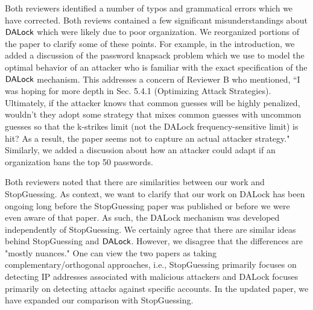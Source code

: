 

 Both reviewers identified a number of typos and grammatical errors which we have corrected. Both reviews contained a few significant misunderstandings about $\mathsf{DALock}$ which were likely due to poor organization. We reorganized portions of the paper to clarify some of these points. For example, in the introduction, we added a discussion of the password knapsack problem which we use to model the optimal behavior of an attacker who is familiar with the exact specification of the $\mathsf{DALock}$ mechanism. This addresses a concern of Reviewer B who mentioned, ``I was hoping for more depth in Sec. 5.4.1 (Optimizing Attack Strategies). Ultimately, if the attacker knows that common guesses will be highly penalized, wouldn't they adopt some strategy that mixes common guesses with uncommon guesses so that the k-strikes limit (not the DALock frequency-sensitive limit) is hit? As a result, the paper seems not to capture an actual attacker strategy." Similarly, we added a discussion about how an attacker could adapt if an organization bans the top 50 passwords. 

 Both reviewers noted that there are similarities between our work and StopGuessing. As context, we want to clarify that our work on DALock has been ongoing long before the StopGuessing paper was published or before we were even aware of that paper. As such, the DALock mechanism was developed independently of StopGuessing. We certainly agree that there are similar ideas behind StopGuessing and $\mathsf{DALock}$. However, we disagree that the differences are "mostly nuances." One can view the two papers as taking complementary/orthogonal approaches, i.e., StopGuessing primarily focuses on detecting IP addresses associated with malicious attackers and DALock focuses primarily on detecting attacks against specific accounts. In the updated paper, we have expanded our comparison with StopGuessing.  



